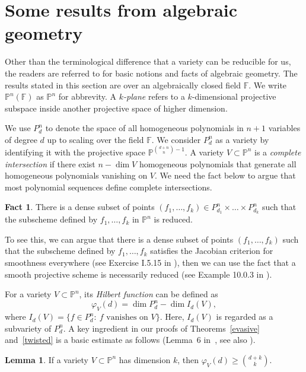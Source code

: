 \documentclass[11pt]{article}
\theoremstyle{definition}
\newtheorem{lemma}[theorem]{Lemma}
\newtheorem{fact}[theorem]{Fact}
\begin{document}
\section{Some results from algebraic geometry}\label{sec:ag}

Other than the terminological difference that a variety can be reducible for us, the readers are referred to \cite{hartshorne} for basic notions and facts of algebraic geometry. The results stated in this section are over an algebraically closed field $\mathbb{F}$. We write $\mathbb{P}^n(\mathbb{F})$ as $\mathbb{P}^n$ for abbrevity. A \textit{$k$-plane} refers to a $k$-dimensional projective subspace inside another projective space of higher dimension.

We use $P^n_{d}$ to denote the space of all homogeneous polynomials in $n+1$ variables of degree $d$ up to scaling over the field $\mathbb{F}$. We consider $P^n_{d}$ as a variety by identifying it with the projective space $\mathbb{P}^{\binom{d+n}{n}-1}$. A variety $V \subset \mathbb{P}^n$ is a \textit{complete intersection} if there exist $n - \dim V$ homogeneous polynomials that generate all homogeneous polynomials vanishing on $V$. We need the fact below to argue that most polynomial sequences define complete intersections.
\begin{fact}\label{reduced}
    There is a dense subset of points $(f_1,\ldots,f_k) \in P^{n}_{d_1}\times\dots\times P^n_{d_k}$ such that the subscheme defined by $f_1,\ldots,f_k$ in $\mathbb{P}^n$ is reduced.
\end{fact}

To see this, we can argue that there is a dense subset of points $(f_1,\ldots,f_k)$ such that the subscheme defined by $f_1,\ldots,f_k$ satisfies the Jacobian criterion for smoothness everywhere (see Exercise I.5.15 in \cite{hartshorne}), then we can use the fact that a smooth projective scheme is necessarily reduced (see Example 10.0.3 in \cite{hartshorne}). %

For a variety $V \subset \mathbb{P}^n$, its \textit{Hilbert function} can be defined as \begin{equation}\label{hilbert1}
    \varphi_V(d) = \dim P^n_{d} - \dim I_d(V),
\end{equation} where $I_d(V) = \{ f \in P^n_{d}:~ \text{$f$ vanishes on $V$}\}$. Here, $I_d(V)$ is regarded as a subvariety of $P^n_{d}$. A key ingredient in our proofs of Theorems~\ref{evasive} and~\ref{twisted} is a basic estimate as follows (Lemma~6 in~\cite{bukh2024extremal}, see also \cite{sombra1997bounds}).
\begin{lemma}\label{hilbert2}
    If a variety $V \subset \mathbb{P}^n$ has dimension $k$, then $\varphi_V(d) \geq \binom{d+k}{k}$.
\end{lemma}
\end{document}
